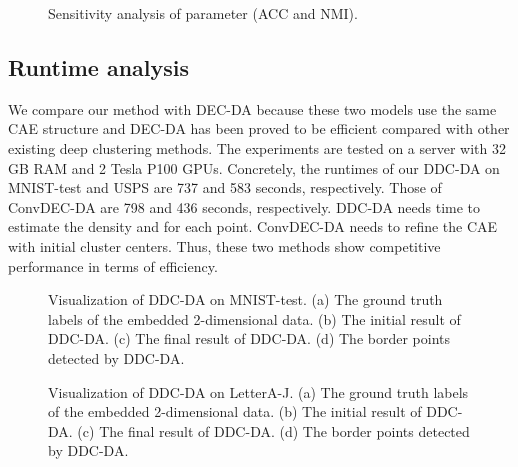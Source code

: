 \documentclass[10pt,twocolumn,letterpaper]{article}
\begin{document}
\begin{figure}[!t]
\centering
{}
\caption{Sensitivity analysis of parameter  (ACC and NMI).}
\label{fig:sensitivity}
\end{figure}


\subsection{Runtime analysis}
We compare our method with DEC-DA \cite{Guo2018DEC-DA} because these two models use the same CAE structure and DEC-DA has been proved to be efficient compared with other existing deep clustering methods. The experiments are tested on a server with 32 GB RAM and 2 Tesla P100 GPUs. 
Concretely, the runtimes of our DDC-DA on MNIST-test and USPS are 737 and 583 seconds, respectively. Those of ConvDEC-DA are 798 and 436 seconds, respectively. DDC-DA needs time to estimate the density  and  for each point. ConvDEC-DA needs to refine the CAE with initial cluster centers. Thus, these two methods show competitive performance in terms of efficiency. 



\begin{figure*}[!t]
\centering
{}
\caption{Visualization of DDC-DA on MNIST-test. (a) The ground truth labels of the embedded 2-dimensional data. (b) The initial result of DDC-DA. (c) The final result of DDC-DA. (d) The border points detected by DDC-DA.}
\label{fig:MNIST_test}
\end{figure*}

\begin{figure*}[!t]
\centering
{}
\caption{Visualization of DDC-DA on LetterA-J. (a) The ground truth labels of the embedded 2-dimensional data. (b) The initial result of DDC-DA. (c) The final result of DDC-DA. (d) The border points detected by DDC-DA.}
\label{fig:nonmnist}
\end{figure*}
\end{document}
